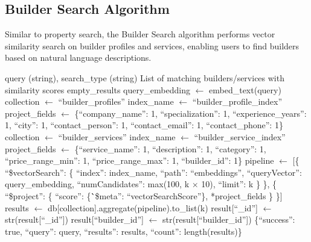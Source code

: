 \subsection{Builder Search Algorithm}

Similar to property search, the Builder Search algorithm performs vector similarity search on builder profiles and services, enabling users to find builders based on natural language descriptions.

\begin{algorithm}[H]
\caption{Builder Vector Similarity Search}
\label{alg:builder_search}
\begin{algorithmic}[1]
\REQUIRE query (string), search\_type (string) 
\ENSURE List of matching builders/services with similarity scores
    \RETURN empty\_results
\ENDIF
\STATE {}
\STATE query\_embedding $\leftarrow$ embed\_text(query)
\STATE
\STATE {}
    \STATE collection $\leftarrow$ ``builder\_profiles''
    \STATE index\_name $\leftarrow$ ``builder\_profile\_index''
    \STATE project\_fields $\leftarrow$ \{``company\_name'': 1, ``specialization'': 1, ``experience\_years'': 1, ``city'': 1, ``contact\_person'': 1, ``contact\_email'': 1, ``contact\_phone'': 1\}
    \STATE collection $\leftarrow$ ``builder\_services''
    \STATE index\_name $\leftarrow$ ``builder\_service\_index''
    \STATE project\_fields $\leftarrow$ \{``service\_name'': 1, ``description'': 1, ``category'': 1, ``price\_range\_min'': 1, ``price\_range\_max'': 1, ``builder\_id'': 1\}
\ENDIF
\STATE
\STATE {}
\STATE pipeline $\leftarrow$ [\{
\STATE \quad ``\$vectorSearch'': \{
\STATE \quad \quad ``index'': index\_name,
\STATE \quad \quad ``path'': ``embeddings'',
\STATE \quad \quad ``queryVector'': query\_embedding,
\STATE \quad \quad ``numCandidates'': max(100, k $\times$ 10),
\STATE \quad \quad ``limit'': k
\STATE \quad \}
\STATE \}, \{
\STATE \quad ``\$project'': \{
\STATE \quad \quad ``score'': \{\``\$meta'': ``vectorSearchScore''\},
\STATE \quad \quad **project\_fields
\STATE \quad \}
\STATE \}]
\STATE
\STATE {}
\STATE results $\leftarrow$ db[collection].aggregate(pipeline).to\_list(k)
\STATE
\STATE {}
    \STATE result[``\_id''] $\leftarrow$ str(result[``\_id''])
        \STATE result[``builder\_id''] $\leftarrow$ str(result[``builder\_id''])
    \ENDIF
\ENDFOR
\RETURN \{``success'': true, ``query'': query, ``results'': results, ``count'': length(results)\}
\end{algorithmic}
\end{algorithm}

